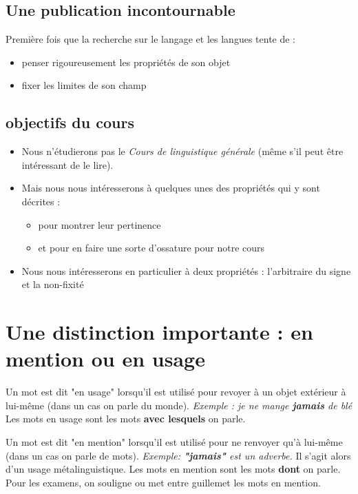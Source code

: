 \subsection{Une publication incontournable}
Première fois que la recherche sur le langage et les langues tente de :
\begin{itemize}
   \item penser rigoureusement les propriétés de son objet
   \item fixer les limites de son champ
\end{itemize}

\subsection{objectifs du cours}
\begin{itemize}
   \item Nous n'étudierons pas le \textit{Cours de linguistique générale} (même s'il peut être intéressant de le lire).
   \item Mais nous nous intéresserons à quelques unes des propriétés qui y sont décrites :
      \begin{itemize} 
               \item pour montrer leur pertinence 
               \item et pour en faire une sorte d'ossature pour notre cours
      \end{itemize}
   \item Nous nous intéresserons en particulier à deux propriétés : l'arbitraire du signe et la non-fixité
\end{itemize}

\section{Une distinction importante : en mention ou en usage}

Un mot est dit "en usage" lorsqu'il est utilisé pour revoyer à un objet extérieur à lui-même (dans un cas on parle du monde).
\textit{Exemple : je ne mange \textbf{jamais} de blé}
Les mots en usage sont les mots \textbf{avec lesquels} on parle.

Un mot est dit "en mention" lorsqu'il est utilisé pour ne renvoyer qu'à lui-même (dans un cas on parle de mots).
\textit{Exemple: \textbf{"jamais"} est un adverbe.}
Il s'agit alors d'un usage métalinguistique.
Les mots en mention sont les mots \textbf{dont} on parle.
Pour les examens, on souligne ou met entre guillemet les mots en mention.


